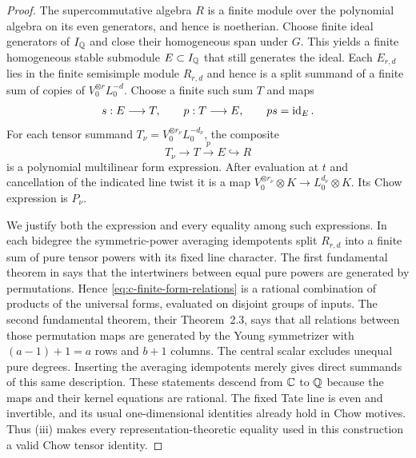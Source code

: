 \begin{proof}
The supercommutative algebra $R$ is a finite module over the
polynomial algebra on its even generators, and hence is
noetherian.  Choose finite ideal generators of $I_\mathbb Q$ and close
their homogeneous span under $G$.  This yields a finite
homogeneous stable submodule $E\subset I_\mathbb Q$ that still generates
the ideal.  Each $E_{r,d}$ lies in the finite semisimple module
$R_{r,d}$ and hence is a split summand of a finite sum of copies
of $V_0^{\otimes r}L_0^{-d}$.  Choose a finite such sum $T$ and
maps
\[
 s:E\longrightarrow T,\qquad p:T\longrightarrow E,
 \qquad ps=\operatorname{id}_E.
\]
For each tensor summand $T_\nu=V_0^{\otimes r_\nu}L_0^{-d_\nu}$,
the composite
\begin{equation}
 T_\nu\longrightarrow T\xrightarrow{p}E\hookrightarrow R
 \label{eq:c-finite-form-relations}
\end{equation}
is a polynomial multilinear form expression.  After evaluation
at $t$ and cancellation of the indicated line twist it is a map
$V_0^{\otimes r_\nu}\otimes K\to L_0^{d_\nu}\otimes K$.
Its Chow expression is $P_\nu$.

We justify both the expression and every equality among such
expressions.  In each bidegree the symmetric-power averaging
idempotents split $R_{r,d}$ into a finite sum of pure tensor
powers with its fixed line character.  The first fundamental
theorem in \citet[Theorem~2.1]{c_lehrerzhang2021super} says that
the intertwiners between equal pure powers are generated by
permutations.  Hence \eqref{eq:c-finite-form-relations} is a rational combination of products
of the universal forms, evaluated on disjoint groups of inputs.
The second fundamental theorem, their Theorem~2.3, says that all
relations between those permutation maps are generated by the
Young symmetrizer with $(a-1)+1=a$ rows and $b+1$ columns.
The central scalar excludes unequal pure degrees.  Inserting
the averaging idempotents merely gives direct summands of this
same description.  These statements descend from $\mathbb C$ to $\mathbb Q$
because the maps and their kernel equations are rational.
The fixed Tate line is even and invertible, and its usual
one-dimensional identities already hold in Chow motives.
Thus (iii) makes every representation-theoretic equality used
in this construction a valid Chow tensor identity.


\end{proof}
